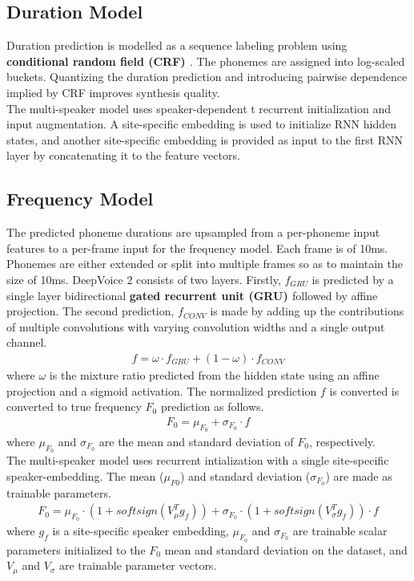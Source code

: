 \documentclass[twosided]{article}
\begin{document}
\subsection*{Duration Model}
Duration prediction is modelled as a sequence labeling problem using \textbf{conditional random field (CRF) \cite{CRF}}. The phonemes are assigned into log-scaled buckets. Quantizing the duration prediction and introducing pairwise dependence implied by CRF improves synthesis quality. \\ 
The multi-speaker model uses speaker-dependent t recurrent initialization and input augmentation. A site-specific embedding is used to initialize RNN hidden states, and another site-specific embedding is provided as input to the first RNN layer by concatenating it to the feature vectors.

\subsection*{Frequency Model}
The predicted phoneme durations are upsampled from a per-phoneme input features to a per-frame input for the frequency model. Each frame is of 10ms. Phonemes are either extended or split into multiple frames so as to maintain the size of 10ms. DeepVoice 2 consists of two layers. Firstly, $f_{GRU}$ is predicted by a single layer bidirectional \textbf{gated recurrent unit (GRU) \cite{GRU}} followed by affine projection. The second prediction, $f_{CONV}$ is made by adding up the contributions of multiple convolutions with varying convolution widths and a single output channel.
    \begin{align*}
	    f = \omega \cdot f_{GRU} + (1 - \omega) \cdot f_{CONV}
	\end{align*}
where $\omega$ is the mixture ratio predicted from the hidden state using an affine projection and a sigmoid activation.
The normalized prediction $f$ is converted is converted to true frequency $F_0$ prediction as follows.
    \begin{align*}
	    F_0 = \mu_{F_0} + \sigma_{F_0} \cdot f
	\end{align*}
where $\mu_{F_0}$ and $\sigma_{F_0}$ are the mean and standard deviation of $F_0$, respectively.\\
The multi-speaker model uses recurrent intialization with a single site-specific speaker-embedding. The mean ($\mu_{F0}$) and standard deviation ($\sigma_{F_0}$) are made as trainable parameters.
    \begin{align*}
	    F_0 = \mu_{F_0} \cdot (1 + softsign(V_{\mu}^Tg_f)) + \sigma_{F_0} \cdot (1 + softsign(V_{\sigma}^Tg_f)) \cdot f
	\end{align*}
where $g_f$ is a site-specific speaker embedding, $\mu_{F_0}$ and $\sigma_{F_0}$ are trainable scalar parameters initialized
to the $F_0$ mean and standard deviation on the dataset, and $V_{\mu}$ and $V_{\sigma}$ are trainable parameter vectors.
\end{document}
